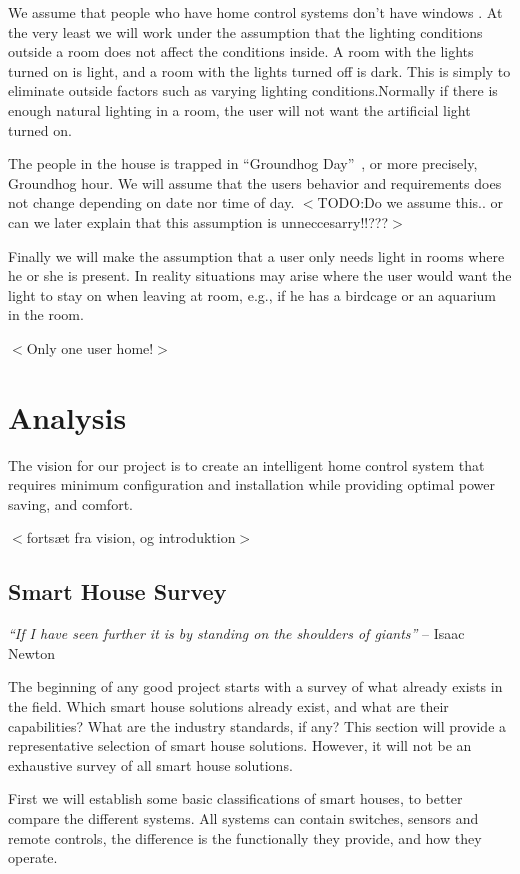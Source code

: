 We assume that people who have home control systems don't have windows . At the very least we will work under the assumption that the lighting conditions outside a room does not affect the conditions inside. A room with the lights turned on is light, and a room with the lights turned off is dark. This is simply to eliminate outside factors such as varying lighting conditions.Normally if there is enough natural lighting in a room, the user will not want the artificial light turned on. 

The people in the house is trapped in ``Groundhog Day''~\citep{ramis:1993}, or more precisely, Groundhog hour. We will assume that the users behavior and requirements does not change depending on date nor time of day.
$<$TODO:Do we assume this.. or can we later explain that this assumption is unneccesarry!!???$>$

Finally we will make the assumption that a user only needs light in rooms where he or she is present. In reality situations may arise where the user would want the light to stay on when leaving at room, e.g., if he has a birdcage or an aquarium in the room.

$<$Only one user home!$>$

\chapter{Analysis}
\label{analysis}

The vision for our project is to create an intelligent home control system that requires minimum configuration and installation while providing optimal power saving, and comfort. 

$<$fortsæt fra vision, og introduktion$>$

\section{Smart House Survey}
\label{smarthousesurvey}

\emph{``If I have seen further it is by standing on the shoulders of giants''} -- Isaac Newton

The beginning of any good project starts with a survey of what already exists in the field. Which smart house solutions already exist, and what are their capabilities? What are the industry standards, if any? This section will provide a representative selection of smart house solutions. However, it will not be an exhaustive survey of all smart house solutions.

First we will establish some basic classifications of smart houses, to better compare the different systems. All systems can contain switches, sensors and remote controls, the difference is the functionally they provide, and how they operate.

